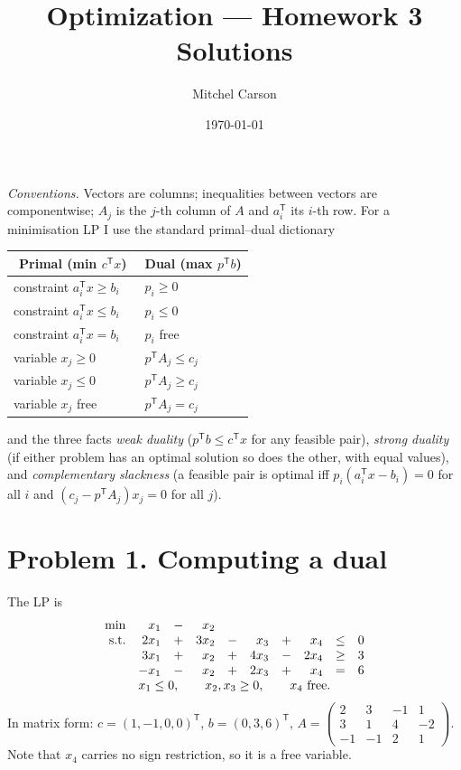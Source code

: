 \documentclass[11pt]{article}
\title{Optimization --- Homework 3 \\ \large Solutions}
\author{Mitchel Carson}
\date{\today}
\newcommand{\T}{^{\mathsf T}}
\begin{document}
\maketitle

\noindent\textit{Conventions.} Vectors are columns; inequalities between vectors are componentwise; $A_j$ is the $j$-th column of $A$ and $a_i\T$ its $i$-th row. For a minimisation LP I use the standard primal--dual dictionary
\begin{center}\renewcommand{\arraystretch}{1.15}
\begin{tabular}{@{}ll@{\qquad\qquad}ll@{}}\toprule
\multicolumn{2}{c}{\textbf{Primal} (min $c\T x$)} & \multicolumn{2}{c}{\textbf{Dual} (max $p\T b$)}\\ \midrule
constraint $a_i\T x\ge b_i$ & & $p_i\ge0$ &\\
constraint $a_i\T x\le b_i$ & & $p_i\le0$ &\\
constraint $a_i\T x= b_i$ & & $p_i$ free &\\[2pt]
variable $x_j\ge0$ & & $p\T A_j\le c_j$ &\\
variable $x_j\le0$ & & $p\T A_j\ge c_j$ &\\
variable $x_j$ free & & $p\T A_j= c_j$ &\\ \bottomrule
\end{tabular}\end{center}
and the three facts \emph{weak duality} ($p\T b\le c\T x$ for any feasible pair), \emph{strong duality} (if either problem has an optimal solution so does the other, with equal values), and \emph{complementary slackness} (a feasible pair is optimal iff $p_i(a_i\T x-b_i)=0$ for all $i$ and $(c_j-p\T A_j)x_j=0$ for all $j$).

\section*{Problem 1. Computing a dual}

The LP is
\[
\begin{array}{rrcrcrcrcl}
\min & x_1 &-& x_2\\
\text{s.t.} & 2x_1&+&3x_2&-&x_3&+&x_4&\le&0\\
& 3x_1&+&x_2&+&4x_3&-&2x_4&\ge&3\\
& -x_1&-&x_2&+&2x_3&+&x_4&=&6\\
& \multicolumn{9}{l}{x_1\le0,\qquad x_2,x_3\ge0,\qquad x_4\ \text{free}.}
\end{array}
\]
In matrix form: $c=(1,-1,0,0)\T$, $b=(0,3,6)\T$,
$A=\begin{pmatrix}2&3&-1&1\\3&1&4&-2\\-1&-1&2&1\end{pmatrix}$.
Note that $x_4$ carries no sign restriction, so it is a free variable.
\end{document}

